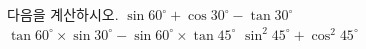 다음을 계산하시오.
 $\sin 60^\circ+\cos 30^\circ-\tan 30^\circ$
 $\tan 60^\circ\times\sin 30^\circ-\sin 60^\circ\times\tan 45^\circ$
 $\sin^2 45^\circ+\cos^2 45^\circ$
